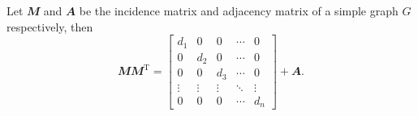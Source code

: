 \documentclass[math, code]{amznotes}
\theoremstyle{remark}
\begin{document}
\begin{probox}{}{}
    Let $\mathbfit{M}$ and $\mathbfit{A}$ be the incidence matrix and adjacency matrix of a simple graph $G$ respectively, then
    \begin{equation*}
        \mathbfit{M}\mathbfit{M}^{\mathrm{T}} = \begin{bmatrix}
            d_1 & 0 & 0 & \cdots & 0 \\
            0 & d_2 & 0 & \cdots & 0 \\
            0 & 0 & d_3 & \cdots & 0 \\
            \vdots & \vdots & \vdots & \ddots & \vdots \\
            0 & 0 & 0 & \cdots & d_n
        \end{bmatrix} + \mathbfit{A}.
    \end{equation*}
\end{probox}
\end{document}
